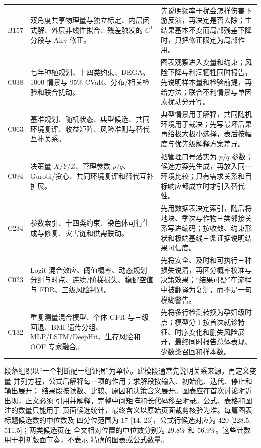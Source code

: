 \begin{longtable}{p{1.4cm}p{5.2cm}p{7.0cm}}
B157 & 双角度共享物理量与独立标定、内层闭式解、外层非线性拟合、残差触发的 $C^1$ 分段与 Airy 修正。 &
先说明频率干扰会怎样伤害下游反演，再决定是否去除；主结果基本不变而局部残差下降时，只把修正限定为局部作用。\\
C038 & 七年种植规划、十四类约束、DEGA、1000 情景与 95\% CVaR、分布/相关检验和联合扰动。 &
图表观察进入变量和约束；风险下降与利润牺牲同时报告，先说明样本量和检验前提，再给方法；联合不利情景与单因素扰动分开写。\\
C063 & 基准规划、随机状态、典型候选、共同环境复评、收益矩阵、风险准则与替代互补关系。 &
典型情景用于解释，共同随机环境用于裁决；先写最坏后果再给极大极小选择，表后按幅度与优先级解释方案差异。\\
C094 & 决策量 $X/Y/Z$、管理参数 $p/q$、Gurobi/贪心、共同环境复评和替代互补扩展。 &
把管理口号落实为 $p/q$ 参数；候选方案先生成，再放入同一环境比较；只有需求关系和目标响应都成立时才引入替代性。\\
C234 & 参数索引、十四类约束、染色体可行生成与修复、灾害链和供需联动。 &
先用数据表决定索引，随后将地块、季次与作物三类邻接关系写进编码；按收敛、约束形状和极端基线三条证据说明结果可信度。\\
C023 & Logit 混合效应、阈值概率、动态规划分组与时点、连续/阶梯损失、稳健空值与 FDR、三级风险判别。 &
先将安全、及时和可执行三种损失说清，再区分概率校准与决策效果；“结果可疑”在流程中被翻译为复测，而不是一句模糊警告。\\
C132 & 重复测量混合模型、个体 GPR 与三级回退、BMI 遗传分组、MLP/LSTM/DeepHit、生存风险和 OOF 专家融合。 &
先将多行检测转换为孕妇级时点；模型分工按首次就诊特征、时序变化和删失风险展开，最终同时报告总体表现、少数类召回和样本数。\\
\bottomrule
\end{longtable}

段落组织以“一个判断配一组证据”为单位。建模段通常先说明关系来源，再定义变量
并列方程，公式后解释每一项的作用；求解段按输入、初始化、迭代、停止和输出展开；
结果段按读数、比较、原因和决策含义展开。图表应在首次讨论附近出现，正文必须
引用并解释，完整中间矩阵和长代码移至附录。公式、表格和图注的数量只能用于
页面候选统计，最终含义以原始页面裁剪核验为准。每篇图表标题候选数的中位数及
四分位范围为 17 [14, 23]，公式行候选对应为 420 [228.5, 511.5]；两类候选页在
全文相对位置的中位数分别为 29.8\% 和 56.9\%。这些计数用于判断版面节奏，不表示
精确的图表或公式数量。

